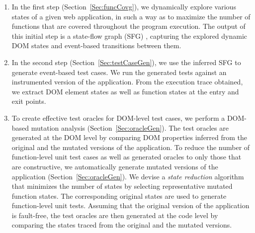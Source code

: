 \begin{enumerate}
 
\item In the first step (Section~\ref{Sec:funcCovg}), we dynamically explore various states of a given web 
application, in such a way as to maximize the number of functions that are covered throughout the program execution. The output of this initial step is a state-flow graph (SFG) \cite{mesbah:tse12}, capturing the explored dynamic DOM states and event-based transitions between them. 

\item In the second step (Section~\ref{Sec:testCaseGen}), we use the inferred SFG to generate event-based test cases.
We run the generated tests against an instrumented version of the application. From the execution trace obtained, we extract DOM element states as well as \javascript function states at the entry and exit points.%

\item To create effective test oracles for DOM-level test cases, we perform a DOM-based mutation analysis (Section~\ref{Sec:oracleGen}).
The test oracles are generated at the DOM level by comparing DOM properties inferred from the original and the mutated versions of the application.
To reduce the number of function-level unit test cases as well as generated oracles to only those that are constructive, 
we automatically generate mutated versions of the application (Section~\ref{Sec:oracleGen}). We devise a \emph{state reduction} algorithm that minimizes the number of states by selecting representative mutated function states. The corresponding original states are used to generate function-level unit tests.
Assuming that the original version of the application is fault-free, the test oracles are then generated at the code level by comparing the states traced from the original and the mutated versions.

\end{enumerate}




  

   